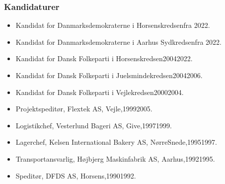 \documentclass[11pt, a4paper]{awesome-cv}
\begin{document}
\begin{cvletter}
\subsubsection*{Kandidaturer}
\begin{itemize}
\item Kandidat for Danmarksdemokraterne i Horsenskredsenfra 2022.
\item Kandidat for Danmarksdemokraterne i Aarhus Sydkredsenfra 2022.
\item Kandidat for Dansk Folkeparti i Horsenskredsen20042022.
\item Kandidat for Dansk Folkeparti i Juelsmindekredsen20042006.
\item Kandidat for Dansk Folkeparti i Vejlekredsen20002004.
\end{itemize}
\begin{itemize}
\item Projektspeditør, Flextek AS, Vejle,19992005.
\item Logistikchef, Vesterlund Bageri AS, Give,19971999.
\item Lagerchef, Kelsen International Bakery AS, NørreSnede,19951997.
\item Transportansvarlig, Højbjerg Maskinfabrik AS, Aarhus,19921995.
\item Speditør, DFDS AS, Horsens,19901992.
\end{itemize}
\end{cvletter}
\end{document}
